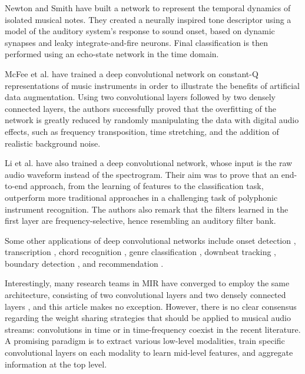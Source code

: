 \documentclass{article}
\makeatletter
\newcommand*{\etal}{et al.\@\xspace}
\makeatother
\begin{document}
Newton and Smith \cite{Newton2012} have built a network to represent the temporal 
dynamics of isolated musical notes.
They created a neurally inspired tone descriptor using a model of the auditory system's 
response to sound onset, based on dynamic synapses and leaky integrate-and-fire neurons.  
Final classification is then performed using an echo-state network in the time domain.

McFee \etal \cite{McFee2015-muda} have trained a deep convolutional network on
constant-Q representations of music instruments in order to illustrate the benefits of
artificial data augmentation.
Using two convolutional layers followed by two densely connected
layers, the authors successfully proved that the overfitting of the network is
greatly reduced by randomly manipulating the data with digital audio effects, such as
frequency transposition, time stretching, and the addition of realistic background noise.

Li \etal \cite{Li2015} have also trained a deep convolutional network, whose input is
the raw audio waveform instead of the spectrogram.
Their aim was to prove that an end-to-end approach,
from the learning of features to the classification task, outperform more traditional
approaches in a challenging task of polyphonic instrument recognition.
The authors also remark that the filters learned in the first layer are
frequency-selective, hence resembling an auditory filter bank.

Some other applications of deep convolutional networks include onset
detection \cite{Schluter2014}, transcription \cite{Sigtia2015},
chord recognition \cite{Humphrey2012tonnetz},
genre classification \cite{Choi2015},
downbeat tracking \cite{Durand2016},
boundary detection \cite{Ullrich2014}, and
recommendation \cite{vandenOord2013}.

Interestingly, many research teams in MIR have converged to employ the same
architecture, consisting of two convolutional layers and two densely connected layers
\cite{Dieleman2014, Humphrey2012tonnetz,
Kereliuk2015, Li2015, McFee2015-muda, Schluter2014, Ullrich2014}, and this
article makes no exception.
However, there is no clear consensus regarding the
weight sharing strategies that should be applied to musical audio streams:
convolutions in time or in time-frequency coexist in the recent literature.
A promising paradigm \cite{Dieleman2011, Durand2016} is to extract various
low-level modalities, train specific convolutional layers on each modality
to learn mid-level features, and aggregate information at the top level.
\end{document}
